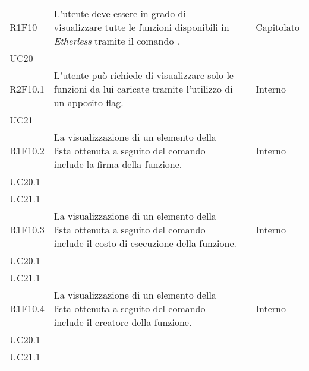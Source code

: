 \begin{longtable}{ 
		>{\centering}p{} 
		>{}p{} 
		>{\centering}p{}
		>{\centering}p{} }
	R1F10 & L'utente deve essere in grado di visualizzare tutte le funzioni 
		disponibili in \textit{Etherless} tramite il comando \lista{}. 				& \ob & Capitolato \\ UC20 \tabularnewline
	R2F10.1 & L'utente può richiede di visualizzare solo le funzioni da 
		lui caricate tramite l'utilizzo di un apposito flag.						& \de & Interno \\ UC21 \tabularnewline
	R1F10.2 & La visualizzazione di un elemento della lista ottenuta a seguito 
		del comando \lista{} include la firma della funzione. 						& \ob & Interno \\ UC20.1 \\ UC21.1 \tabularnewline
	R1F10.3 & La visualizzazione di un elemento della lista ottenuta a seguito 
		del comando \lista{} include il costo di esecuzione della funzione. 			& \ob & Interno \\ UC20.1 \\ UC21.1 \tabularnewline
	R1F10.4 & La visualizzazione di un elemento della lista ottenuta a seguito 
		del comando \lista{} include il creatore della funzione. 					& \ob & Interno \\ UC20.1 \\ UC21.1 \tabularnewline


\end{longtable}

